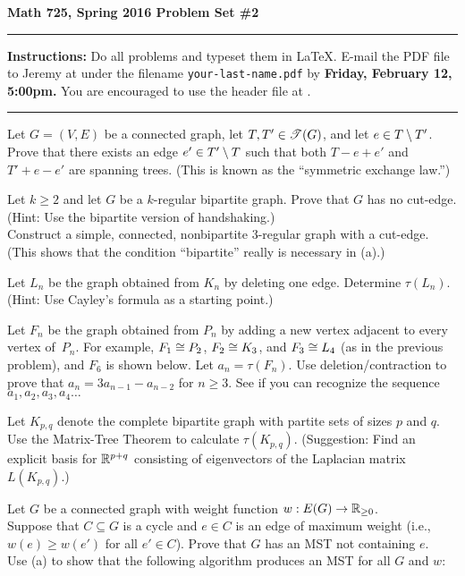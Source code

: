 

\thispagestyle{empty} %
{\bf Math 725, Spring 2016 \hfill Problem Set \#2}
\smallskip\hrule

{\bf Instructions:} Do all problems and typeset them in \LaTeX.  E-mail the PDF file to Jeremy at  under the filename {\tt your-last-name.pdf} by {\bf Friday, February 12, 5:00pm.}
You are encouraged to use the header file at .
\smallskip\hrule

\prob Let $G=(V,E)$ be a connected graph, let $T,T'\in\mathscr{T}(G)$, and let $e\in T\setminus T'$.  Prove that there exists an edge $e'\in T'\setminus T$ such that both $T-e+e'$ and $T'+e-e'$ are spanning trees.  (This is known as the ``symmetric exchange law.'')

\prob\probpart Let $k\geq 2$ and let $G$ be a $k$-regular bipartite graph.  Prove that $G$ has no cut-edge. (Hint: Use the bipartite version of handshaking.)\paddown\\
\probpart Construct a simple, connected, nonbipartite $3$-regular graph with a cut-edge.  (This shows that the condition ``bipartite'' really
is necessary in (a).)

\prob Let $L_n$ be the graph obtained from $K_n$ by deleting one edge.  Determine $\tau(L_n)$.  (Hint: Use Cayley's formula as a starting point.)

\prob Let $F_n$ be the graph obtained from $P_n$ by adding a new vertex adjacent to every vertex of~$P_n$.  %
For example, $F_1\cong P_2$, $F_2\cong K_3$, and $F_3\cong L_4$ (as in the previous problem), and $F_6$ is shown below.
Let $a_n=\tau(F_n)$.  Use deletion/contraction to prove that $a_n=3a_{n-1}-a_{n-2}$ for $n\geq 3$.  See if you can recognize the sequence $a_1,a_2,a_3,a_4\dots$

\prob
Let $K_{p,q}$ denote the complete bipartite graph with partite sets of sizes $p$ and $q$.  Use the Matrix-Tree Theorem to calculate $\tau(K_{p,q})$.  (Suggestion: Find an explicit basis for ${\mathbb R}^{p+q}$ consisting of eigenvectors of the Laplacian matrix $L(K_{p,q})$.)

\prob Let $G$ be a connected graph with weight function $w:E(G)\to{\mathbb R}_{\geq0}$.\paddown\\
\probpart  Suppose that $C\subseteq G$ is a cycle and $e\in C$ is an edge of maximum weight (i.e., $w(e)\geq w(e')$ for all $e'\in C$).  Prove
that $G$ has an MST not containing $e$.\paddown\\
\probpart Use (a) to show that the following algorithm produces an MST for all $G$ and $w$:



